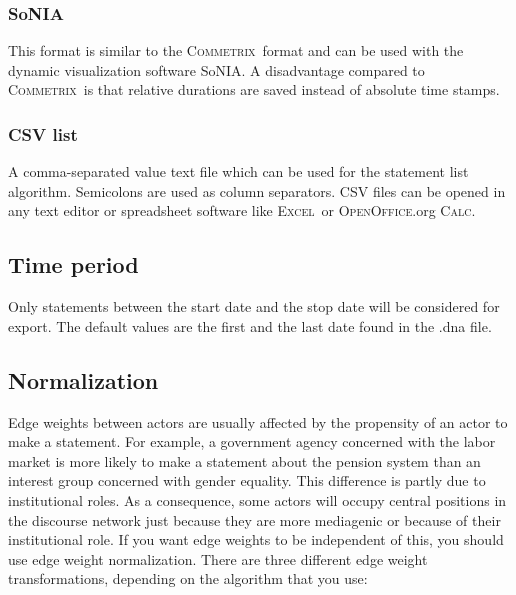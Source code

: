 \documentclass[12pt,a4paper]{scrreprt}
\newcommand{\excel}{\textsc{Excel}}
\newcommand{\calc}{\textsc{OpenOffice}.org \textsc{Calc}}
\newcommand{\commetrix}{\textsc{Commetrix}}
\newcommand{\sonia}{SoNIA}
\begin{document}
\subsubsection{SoNIA}
This format is similar to the \commetrix\ format and can be used with the dynamic visualization software \sonia. A disadvantage compared to \commetrix\ is that relative durations are saved instead of absolute time stamps.

\subsubsection{CSV list}
A comma-separated value text file which can be used for the statement list algorithm. Semicolons are used as column separators. CSV files can be opened in any text editor or spreadsheet software like \excel\ or \calc.


\subsection{Time period}
Only statements between the start date and the stop date will be considered for export. The default values are the first and the last date found in the .dna file.

\subsection{Normalization}
Edge weights between actors are usually affected by the propensity of an actor to make a statement. For example, a government agency concerned with the labor market is more likely to make a statement about the pension system than an interest group concerned with gender equality. This difference is partly due to institutional roles. As a consequence, some actors will occupy central positions in the discourse network just because they are more mediagenic or because of their institutional role. If you want edge weights to be independent of this, you should use edge weight normalization. There are three different edge weight transformations, depending on the algorithm that you use:
\end{document}
